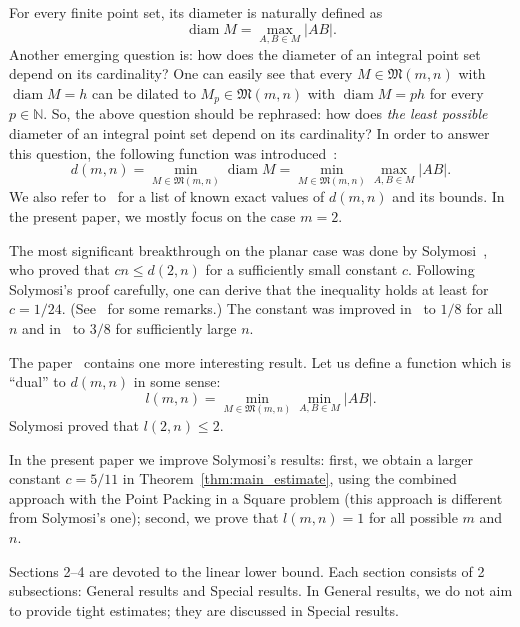 \documentclass[a4paper,14pt]{article} %
\theoremstyle{plain}
\theoremstyle{definition}
\begin{document}
For every finite point set, its diameter is naturally defined as
\begin{equation}
	\operatorname{diam} M = \max_{A,B\in M} |AB|
	.
\end{equation}
Another emerging question is: how does the diameter of an integral point set depend on its cardinality?
One can easily see that every $M\in\mathfrak{M}(m,n)$ with $\operatorname{diam} M = h$
can be dilated to $M_p\in\mathfrak{M}(m,n)$ with $\operatorname{diam} M = ph$
for every $p\in\mathbb{N}$.
So, the above question should be rephrased:
how does \textit{the least possible} diameter of an integral point set depend on its cardinality?
In order to answer this question, the following function was introduced~\cite{kurz2008bounds,kurz2008minimum}:
\begin{equation}
	d(m,n) = \min_{M\in\mathfrak{M}(m,n)} \operatorname{diam} M = \min_{M\in\mathfrak{M}(m,n)} \max_{A,B\in M} |AB|
	.
\end{equation}
We also refer to~\cite{kurz2008bounds} for a list of known exact values of $d(m,n)$ and its bounds.
In the present paper, we mostly focus on the case $m=2$.

The most significant breakthrough on the planar case was done by Solymosi~\cite{solymosi2003note},
who proved that $cn \leq d(2,n)$ for a sufficiently small constant $c$.
Following Solymosi's proof carefully,
one can derive that the inequality holds at least for $c = 1/24$.
(See~\cite[Exercise 2.6]{garibaldi2005erdos} for some remarks.)
The constant was improved in~\cite{our-mz-rus-translit} to $1/8$ for all $n$ and in~\cite{our-vmmsh-2018-translit}
to $3/8$ for sufficiently large $n$.

The paper~\cite{solymosi2003note} contains one more interesting result.
Let us define a function which is ``dual'' to $d(m,n)$ in some sense:
\begin{equation}
	l(m,n) = \min_{M\in\mathfrak{M}(m,n)} \min_{A,B\in M} |AB|
	.
\end{equation}
Solymosi proved that $l(2,n)\leq 2$.

In the present paper we improve Solymosi's results:
first, we obtain a larger constant $c = 5/11$ in Theorem~\ref{thm:main_estimate},
using the combined approach with the Point Packing in a Square problem
(this approach is different from Solymosi's one);
second, we prove that $l(m,n)=1$ for all possible $m$ and $n$.

Sections 2--4 are devoted to the linear lower bound.
Each section consists of 2 subsections: General results and Special results.
In General results, we do not aim to provide tight estimates;
they are discussed in Special results.
\end{document}

